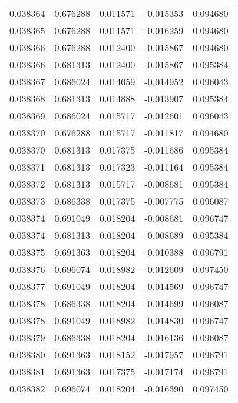 \begin{tabular}{lrrrr}
0.038364    &  0.676288 &  0.011571 & -0.015353 &             0.094680 \\
0.038365    &  0.676288 &  0.011571 & -0.016259 &             0.094680 \\
0.038366    &  0.676288 &  0.012400 & -0.015867 &             0.094680 \\
0.038366    &  0.681313 &  0.012400 & -0.015867 &             0.095384 \\
0.038367    &  0.686024 &  0.014059 & -0.014952 &             0.096043 \\
0.038368    &  0.681313 &  0.014888 & -0.013907 &             0.095384 \\
0.038369    &  0.686024 &  0.015717 & -0.012601 &             0.096043 \\
0.038370    &  0.676288 &  0.015717 & -0.011817 &             0.094680 \\
0.038370    &  0.681313 &  0.017375 & -0.011686 &             0.095384 \\
0.038371    &  0.681313 &  0.017323 & -0.011164 &             0.095384 \\
0.038372    &  0.681313 &  0.015717 & -0.008681 &             0.095384 \\
0.038373    &  0.686338 &  0.017375 & -0.007775 &             0.096087 \\
0.038374    &  0.691049 &  0.018204 & -0.008681 &             0.096747 \\
0.038374    &  0.681313 &  0.018204 & -0.008689 &             0.095384 \\
0.038375    &  0.691363 &  0.018204 & -0.010388 &             0.096791 \\
0.038376    &  0.696074 &  0.018982 & -0.012609 &             0.097450 \\
0.038377    &  0.691049 &  0.018204 & -0.014569 &             0.096747 \\
0.038378    &  0.686338 &  0.018204 & -0.014699 &             0.096087 \\
0.038378    &  0.691049 &  0.018982 & -0.014830 &             0.096747 \\
0.038379    &  0.686338 &  0.018204 & -0.016136 &             0.096087 \\
0.038380    &  0.691363 &  0.018152 & -0.017957 &             0.096791 \\
0.038381    &  0.691363 &  0.017375 & -0.017174 &             0.096791 \\
0.038382    &  0.696074 &  0.018204 & -0.016390 &             0.097450 \\

\end{tabular}
